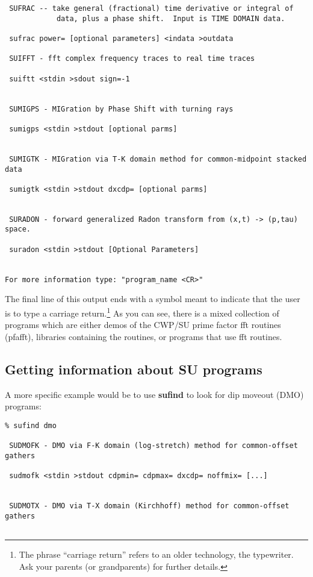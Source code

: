 {{{\begin{verbatim}
 SUFRAC -- take general (fractional) time derivative or integral of     
            data, plus a phase shift.  Input is TIME DOMAIN data.       

 sufrac power= [optional parameters] <indata >outdata                   

 SUIFFT - fft complex frequency traces to real time traces      

 suiftt <stdin >sdout sign=-1                                   


 SUMIGPS - MIGration by Phase Shift with turning rays                   

 sumigps <stdin >stdout [optional parms]                                


 SUMIGTK - MIGration via T-K domain method for common-midpoint stacked data

 sumigtk <stdin >stdout dxcdp= [optional parms]                 


 SURADON - forward generalized Radon transform from (x,t) -> (p,tau) space.

 suradon <stdin >stdout [Optional Parameters]                           


For more information type: "program_name <CR>"
\end{verbatim}}\noindent
The final line of this output ends with a symbol meant to indicate that the 
user is to type a carriage return.\footnote{The 
phrase ``carriage return'' refers to an older technology, the typewriter.
Ask your parents (or grandparents) for further details.}
As you can see, there is a mixed collection of programs which 
are either demos of the CWP/SU prime factor fft routines (pfafft),
libraries containing the routines, or programs that use fft routines.

\subsection{Getting information about SU programs}

A more specific example would be to use
{\bf sufind\/} to look for dip moveout (DMO) programs:
{\small\begin{verbatim}
% sufind dmo

 SUDMOFK - DMO via F-K domain (log-stretch) method for common-offset gathers

 sudmofk <stdin >stdout cdpmin= cdpmax= dxcdp= noffmix= [...]           


 SUDMOTX - DMO via T-X domain (Kirchhoff) method for common-offset gathers


\end{verbatim}}}}
